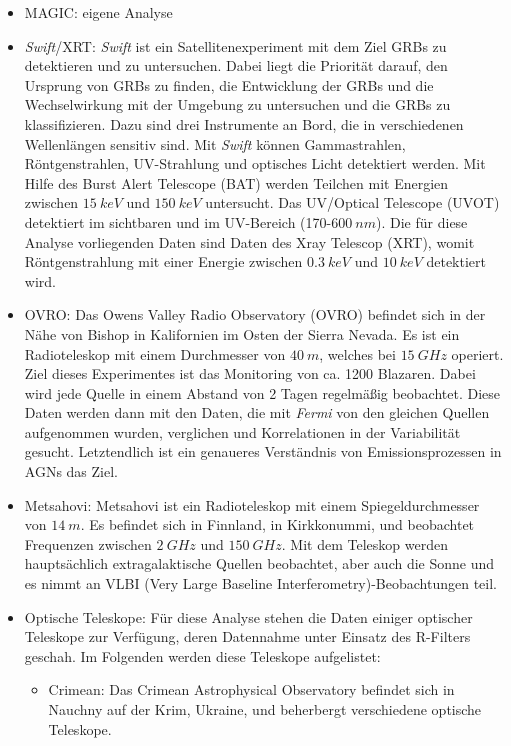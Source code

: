 \begin{itemize}
 \item MAGIC: eigene Analyse
 \item \textit{Swift}/XRT: \textit{Swift} ist ein Satellitenexperiment mit dem Ziel GRBs zu detektieren und zu untersuchen.
  Dabei liegt die Priorität darauf, den Ursprung von GRBs zu finden, die Entwicklung der GRBs und die Wechselwirkung mit der Umgebung zu untersuchen und die GRBs zu klassifizieren.
  Dazu sind drei Instrumente an Bord, die in verschiedenen Wellenlängen sensitiv sind. 
  Mit \textit{Swift} können Gammastrahlen, Röntgenstrahlen, UV-Strahlung und optisches Licht detektiert werden.
  Mit Hilfe des Burst Alert Telescope (BAT) werden Teilchen mit Energien zwischen $\SI{15}{keV}$ und $\SI{150}{keV}$ untersucht.
  Das UV/Optical Telescope (UVOT) detektiert im sichtbaren und im UV-Bereich (170-$\SI{600}{nm}$).
  Die für diese Analyse vorliegenden Daten sind Daten des Xray Telescop (XRT), womit Röntgenstrahlung mit einer Energie zwischen $\SI{0,3}{keV}$ und $\SI{10}{keV}$ detektiert wird.\cite{Swift}
 \item OVRO: Das Owens Valley Radio Observatory (OVRO) befindet sich in der Nähe von Bishop in Kalifornien im Osten der Sierra Nevada.
  Es ist ein Radioteleskop mit einem Durchmesser von $\SI{40}{m}$, welches bei $\SI{15}{GHz}$ operiert.
  Ziel dieses Experimentes ist das Monitoring von ca. 1200 Blazaren.
  Dabei wird jede Quelle in einem Abstand von 2 Tagen regelmäßig beobachtet.
  Diese Daten werden dann mit den Daten, die mit \textit{Fermi} von den gleichen Quellen aufgenommen wurden, verglichen und Korrelationen in der Variabilität gesucht.
  Letztendlich ist ein genaueres Verständnis von Emissionsprozessen in AGNs das Ziel.\cite{OVRO}
 \item Metsahovi: Metsahovi ist ein Radioteleskop mit einem Spiegeldurchmesser von $\SI{14}{m}$. 
  Es befindet sich in Finnland, in Kirkkonummi, und beobachtet Frequenzen zwischen $\SI{2}{GHz}$ und $\SI{150}{GHz}$.
  Mit dem Teleskop werden hauptsächlich extragalaktische Quellen beobachtet, aber auch die Sonne und es nimmt an VLBI (Very Large Baseline Interferometry)-Beobachtungen teil.\cite{Metsahovi}
 \item Optische Teleskope: Für diese Analyse stehen die Daten einiger optischer Teleskope zur Verfügung, deren Datennahme unter Einsatz des R-Filters geschah.
  Im Folgenden werden diese Teleskope aufgelistet:
 \begin{itemize}
  \item Crimean: Das Crimean Astrophysical Observatory befindet sich in Nauchny auf der Krim, Ukraine, und beherbergt verschiedene optische Teleskope.\cite{Crimean}

\end{itemize}
\end{itemize}
